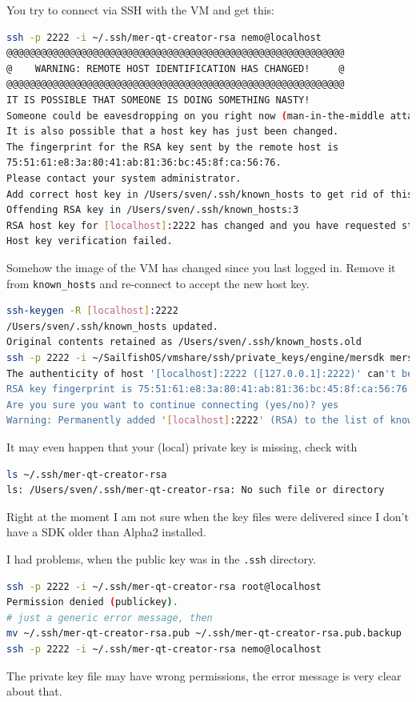 You try to connect via SSH with the VM and get this:
\begin{lstlisting}[language=bash]
ssh -p 2222 -i ~/.ssh/mer-qt-creator-rsa nemo@localhost
@@@@@@@@@@@@@@@@@@@@@@@@@@@@@@@@@@@@@@@@@@@@@@@@@@@@@@@@@@@
@    WARNING: REMOTE HOST IDENTIFICATION HAS CHANGED!     @
@@@@@@@@@@@@@@@@@@@@@@@@@@@@@@@@@@@@@@@@@@@@@@@@@@@@@@@@@@@
IT IS POSSIBLE THAT SOMEONE IS DOING SOMETHING NASTY!
Someone could be eavesdropping on you right now (man-in-the-middle attack)!
It is also possible that a host key has just been changed.
The fingerprint for the RSA key sent by the remote host is
75:51:61:e8:3a:80:41:ab:81:36:bc:45:8f:ca:56:76.
Please contact your system administrator.
Add correct host key in /Users/sven/.ssh/known_hosts to get rid of this message.
Offending RSA key in /Users/sven/.ssh/known_hosts:3
RSA host key for [localhost]:2222 has changed and you have requested strict checking.
Host key verification failed.
\end{lstlisting}
%
Somehow the image of the VM has changed since you last logged in. Remove it from \verb,known_hosts, and re-connect to accept the new host key.
%
\begin{lstlisting}[language=bash]
ssh-keygen -R [localhost]:2222
/Users/sven/.ssh/known_hosts updated.
Original contents retained as /Users/sven/.ssh/known_hosts.old
ssh -p 2222 -i ~/SailfishOS/vmshare/ssh/private_keys/engine/mersdk mersdk@localhost
The authenticity of host '[localhost]:2222 ([127.0.0.1]:2222)' can't be established.
RSA key fingerprint is 75:51:61:e8:3a:80:41:ab:81:36:bc:45:8f:ca:56:76.
Are you sure you want to continue connecting (yes/no)? yes
Warning: Permanently added '[localhost]:2222' (RSA) to the list of known hosts.
\end{lstlisting}
%
It may even happen that your (local) private key is missing, check with
%
\begin{lstlisting}[language=bash]
ls ~/.ssh/mer-qt-creator-rsa
ls: /Users/sven/.ssh/mer-qt-creator-rsa: No such file or directory
\end{lstlisting}
%
Right at the moment I am not sure when the key files were delivered since I don't have a SDK older than Alpha2 installed.

I had problems, when the public key was in the \verb,.ssh, directory.
%
\begin{lstlisting}[language=bash]
ssh -p 2222 -i ~/.ssh/mer-qt-creator-rsa root@localhost
Permission denied (publickey).
# just a generic error message, then
mv ~/.ssh/mer-qt-creator-rsa.pub ~/.ssh/mer-qt-creator-rsa.pub.backup
ssh -p 2222 -i ~/.ssh/mer-qt-creator-rsa nemo@localhost
\end{lstlisting}
%
The private key file may have wrong permissions, the error message is very clear about that.

